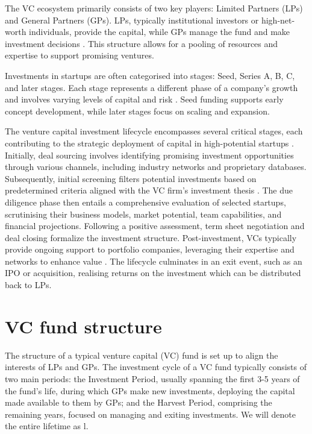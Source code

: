 \documentclass[a4paper, oneside]{discothesis}
\begin{document}
The VC ecosystem primarily consists of two key players: Limited Partners (LPs) and General Partners (GPs). LPs, typically institutional investors or high-net-worth individuals, provide the capital, while GPs manage the fund and make investment decisions \cite{metrick2010venture}. This structure allows for a pooling of resources and expertise to support promising ventures.

Investments in startups are often categorised into stages: Seed, Series A, B, C, and later stages. Each stage represents a different phase of a company's growth and involves varying levels of capital and risk \cite{hellmann2002venture}. Seed funding supports early concept development, while later stages focus on scaling and expansion.

The venture capital investment lifecycle encompasses several critical stages, each contributing to the strategic deployment of capital in high-potential startups \cite{gompers2004venture}. Initially, deal sourcing involves identifying promising investment opportunities through various channels, including industry networks and proprietary databases. Subsequently, initial screening filters potential investments based on predetermined criteria aligned with the VC firm's investment thesis \cite{petty2011}. The due diligence phase then entails a comprehensive evaluation of selected startups, scrutinising their business models, market potential, team capabilities, and financial projections. Following a positive assessment, term sheet negotiation and deal closing formalize the investment structure. Post-investment, VCs typically provide ongoing support to portfolio companies, leveraging their expertise and networks to enhance value \cite{sapienza1996venture}. The lifecycle culminates in an exit event, such as an IPO or acquisition, realising returns on the investment which can be distributed back to LPs.

\section{VC fund structure}

The structure of a typical venture capital (VC) fund is set up to align the interests of LPs and GPs. The investment cycle of a VC fund typically consists of two main periods: the Investment Period, usually spanning the first 3-5 years of the fund's life, during which GPs make new investments, deploying the capital made available to them by GPs; and the Harvest Period, comprising the remaining years, focused on managing and exiting investments. We will denote the entire lifetime as l. 
\end{document}
